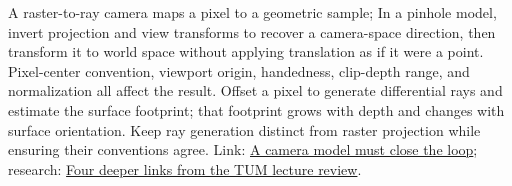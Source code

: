 A raster-to-ray camera maps a pixel to a geometric sample; In a pinhole model, invert projection and view transforms to recover a camera-space direction, then transform it to world space without applying translation as if it were a point. Pixel-center convention, viewport origin, handedness, clip-depth range, and normalization all affect the result. Offset a pixel to generate differential rays and estimate the surface footprint; that footprint grows with depth and changes with surface orientation. Keep ray generation distinct from raster projection while ensuring their conventions agree. Link: \href{Continuous\%20Notes/Computing\%20Foundations\%20-\%20From\%20Bits\%20to\%20C++\%20and\%20Systems\%20APIs\#A\%20camera\%20model\%20must\%20close\%20the\%20loop}{A camera model must close the loop}; research: \href{Continuous\%20Notes/Computing\%20Foundations\%20-\%20From\%20Bits\%20to\%20C++\%20and\%20Systems\%20APIs\#Four\%20deeper\%20links\%20from\%20the\%20TUM\%20lecture\%20review}{Four deeper links from the TUM lecture review}.
